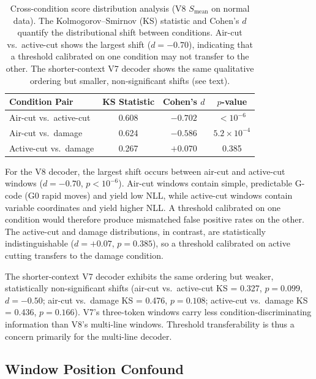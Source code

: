 \begin{table}[t]
\centering
\caption{Cross-condition score distribution analysis (V8 $S_{\text{mean}}$ on normal data). The Kolmogorov--Smirnov (KS) statistic and Cohen's $d$ quantify the distributional shift between conditions. Air-cut vs.\ active-cut shows the largest shift ($d = -0.70$), indicating that a threshold calibrated on one condition may not transfer to the other. The shorter-context V7 decoder shows the same qualitative ordering but smaller, non-significant shifts (see text).}
\label{tab:cross_condition}
\begin{tabular}{@{}lccc@{}}
\toprule
Condition Pair & KS Statistic & Cohen's $d$ & $p$-value \\
\midrule
Air-cut vs.\ active-cut   & 0.608 & $-0.702$ & $< 10^{-6}$ \\
Air-cut vs.\ damage       & 0.624 & $-0.586$ & $5.2 \times 10^{-4}$ \\
Active-cut vs.\ damage    & 0.267 & $+0.070$ & 0.385 \\
\bottomrule
\end{tabular}
\end{table}

For the V8 decoder, the largest shift occurs between air-cut and active-cut windows ($d = -0.70$, $p < 10^{-6}$).
Air-cut windows contain simple, predictable G-code (G0 rapid moves) and yield low NLL, while active-cut windows contain variable coordinates and yield higher NLL.
A threshold calibrated on one condition would therefore produce mismatched false positive rates on the other.
The active-cut and damage distributions, in contrast, are statistically indistinguishable ($d = +0.07$, $p = 0.385$), so a threshold calibrated on active cutting transfers to the damage condition.

The shorter-context V7 decoder exhibits the same ordering but weaker, statistically non-significant shifts (air-cut vs.\ active-cut KS = 0.327, $p = 0.099$, $d = -0.50$; air-cut vs.\ damage KS = 0.476, $p = 0.108$; active-cut vs.\ damage KS = 0.436, $p = 0.166$).
V7's three-token windows carry less condition-discriminating information than V8's multi-line windows.
Threshold transferability is thus a concern primarily for the multi-line decoder.

\subsection{Window Position Confound}
\label{sec:ablation_position}

